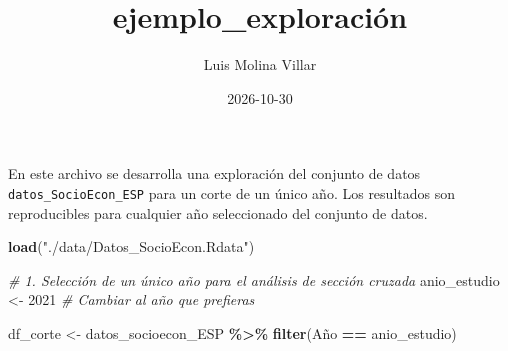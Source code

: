 \documentclass[
]{article}
\title{ejemplo\_exploración}
\author{Luis Molina Villar}
\date{2026-10-30}
\newenvironment{Shaded}{\begin{snugshade}}{\end{snugshade}}
\newcommand{\CommentTok}[1]{\textcolor[rgb]{0.56,0.35,0.01}{\textit{#1}}}
\newcommand{\DecValTok}[1]{\textcolor[rgb]{0.00,0.00,0.81}{#1}}
\newcommand{\FunctionTok}[1]{\textcolor[rgb]{0.13,0.29,0.53}{\textbf{#1}}}
\newcommand{\NormalTok}[1]{#1}
\newcommand{\OtherTok}[1]{\textcolor[rgb]{0.56,0.35,0.01}{#1}}
\newcommand{\SpecialCharTok}[1]{\textcolor[rgb]{0.81,0.36,0.00}{\textbf{#1}}}
\newcommand{\StringTok}[1]{\textcolor[rgb]{0.31,0.60,0.02}{#1}}
\begin{document}
\maketitle

En este archivo se desarrolla una exploración del conjunto de datos
\texttt{datos\_SocioEcon\_ESP} para un corte de un único año. Los
resultados son reproducibles para cualquier año seleccionado del
conjunto de datos.

\begin{Shaded}
\begin{Highlighting}[]
\FunctionTok{load}\NormalTok{(}\StringTok{"./data/Datos\_SocioEcon.Rdata"}\NormalTok{)}

\CommentTok{\# 1. Selección de un único año para el análisis de sección cruzada}
\NormalTok{anio\_estudio }\OtherTok{\textless{}{-}} \DecValTok{2021} \CommentTok{\# Cambiar al año que prefieras}

\NormalTok{df\_corte }\OtherTok{\textless{}{-}}\NormalTok{ datos\_socioecon\_ESP }\SpecialCharTok{\%\textgreater{}\%}
  \FunctionTok{filter}\NormalTok{(Año }\SpecialCharTok{==}\NormalTok{ anio\_estudio)}
\end{Highlighting}
\end{Shaded}
\end{document}
